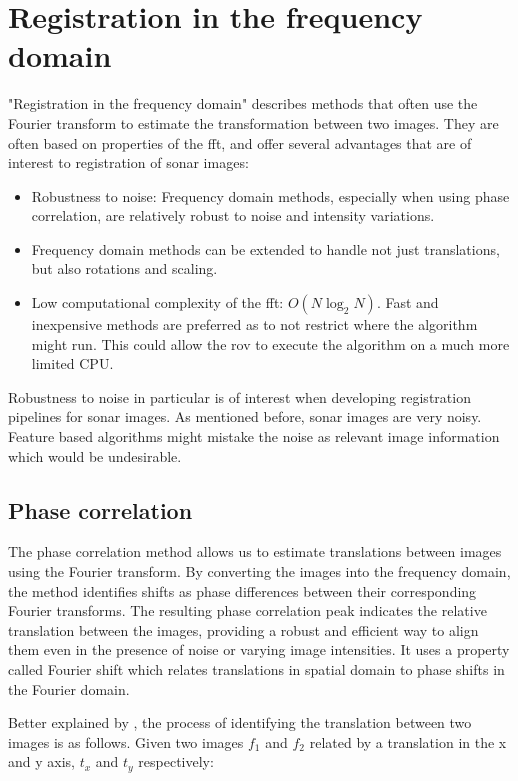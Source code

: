 \section{Registration in the frequency domain}

"Registration in the frequency domain" describes methods that often use the Fourier transform to estimate the transformation between two images. They are often based on properties of the \acrfull{fft}, and offer several advantages that are of interest to registration of sonar images:
\begin{itemize}
    \item Robustness to noise: Frequency domain methods, especially when using phase correlation, are relatively robust to noise and intensity variations.
    \item Frequency domain methods can be extended to handle not just translations, but also rotations and scaling.
    \item Low computational complexity of the \acrshort{fft}:  \(O(N\log_2N)\). Fast and inexpensive methods are preferred as to not restrict where the algorithm might run. This could allow the \acrshort{rov} to execute the algorithm on a much more limited CPU.
\end{itemize}

Robustness to noise in particular is of interest when developing registration pipelines for sonar images. As mentioned before, sonar images are very noisy. Feature based algorithms might mistake the noise as relevant image information which would be undesirable.

\subsection{Phase correlation}

The phase correlation method allows us to estimate translations between images using the Fourier transform. By converting the images into the frequency domain, the method identifies shifts as phase differences between their corresponding Fourier transforms. The resulting phase correlation peak indicates the relative translation between the images, providing a robust and efficient way to align them even in the presence of noise or varying image intensities. It uses a property called Fourier shift which relates translations in spatial domain to phase shifts in the Fourier domain. 


Better explained by \citeauthor{Reddy1996}\cite{Reddy1996}, the process of identifying the translation between two images is as follows. Given two images \(f_1\) and \(f_2\) related by a translation in the x and y axis, \(t_x\) and \(t_y\) respectively:

